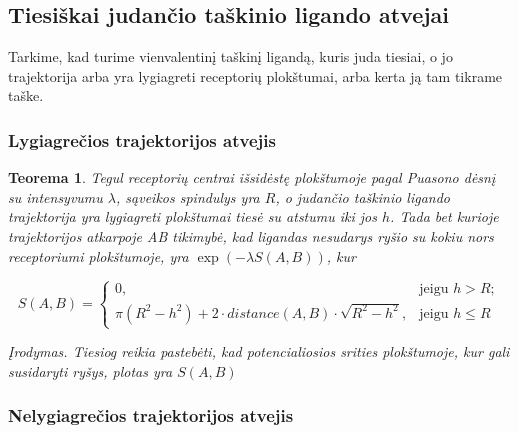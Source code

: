 \documentclass[10pt]{article}
\newtheorem{thm}{Teorema}
\begin{document}
\subsection{Tiesiškai judančio taškinio ligando atvejai}
Tarkime, kad turime vienvalentinį taškinį ligandą, kuris juda tiesiai, o jo trajektorija arba yra lygiagreti receptorių plokštumai, arba kerta ją tam tikrame taške.

\subsubsection{Lygiagrečios trajektorijos atvejis}

\begin{thm}\label{thm:2}
Tegul receptorių centrai išsidėstę plokštumoje  pagal Puasono dėsnį su intensyvumu $\lambda$,  sąveikos spindulys yra $R$, o judančio taškinio ligando trajektorija yra lygiagreti plokštumai tiesė su atstumu iki jos  $ h $. Tada bet kurioje trajektorijos atkarpoje AB tikimybė, kad ligandas nesudarys ryšio su kokiu nors receptoriumi plokštumoje, yra $ \exp( -\lambda S(A,B)) $, kur 

\[
S(A,B) =
\begin{cases}
0, & \text{jeigu } h>R; \\

\pi(R^2-h^2) + 2 \cdot distance(A,B) \cdot \sqrt{R^2-h^2}, & 
 \text{jeigu }  h \leqslant R

\end{cases}
\]

Įrodymas. Tiesiog reikia pastebėti, kad potencialiosios srities plokštumoje, kur gali susidaryti ryšys, plotas yra $ S(A,B) $

\end{thm}

\subsubsection{Nelygiagrečios trajektorijos atvejis}
\end{document}
